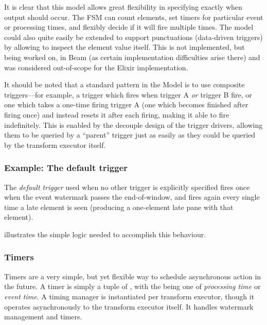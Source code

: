 It is clear that this model allows great flexibility in specifying exactly when output should occur.
The FSM can count elements, set timers for particular event or processing times, and flexibly decide if it will fire multiple times.
The model could also quite easily be extended to support punctuations (data-driven triggers) by allowing  to inspect the element value itself.
This is not implemented, but being worked on, in Beam (as certain implementation difficulties arise there) and was considered out-of-scope for the Elixir implementation.

It should be noted that a standard pattern in the Model is to use composite triggers---for example, a trigger which fires when trigger A \emph{or} trigger B fire, or one which takes a one-time firing trigger A (one which becomes finished after firing once) and instead resets it after each firing, making it able to fire indefinitely.
This is enabled by the decouple design of the trigger drivers, allowing them to be queried by a ``parent'' trigger just as easily as they could be queried by the transform executor itself.

\subsubsection{Example: The default trigger}

The \emph{default trigger} used when no other trigger is explicitly specified fires once when the event watermark passes the end-of-window, and fires again every single time a late element is seen (producing a one-element late pane with that element).

 illustrates the simple logic needed to accomplish this behaviour.


\subsubsection{Timers}

Timers are a very simple, but yet flexible way to schedule asynchronous action in the future.
A timer is simply a tuple of \footnotemark, with the  being one of \emph{processing time} or \emph{event time}.
A timing manager is instantiated per transform executor, though it operates asynchronously to the transform executor itself.
It handles watermark management and timers.

